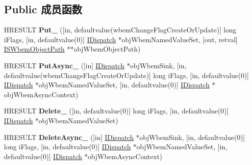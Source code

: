 \subsection*{Public 成员函数}
\begin{DoxyCompactItemize}
\item 
\mbox{\label{interface_wbem_scripting_1_1_i_s_wbem_object_a966384edba1a7bac57d55aaf29cff402}} 
H\+R\+E\+S\+U\+LT {\bfseries Put\+\_\+} (\mbox{[}in, defaultvalue(wbem\+Change\+Flag\+Create\+Or\+Update)\mbox{]} long i\+Flags, \mbox{[}in, defaultvalue(0)\mbox{]} \hyperlink{interface_i_dispatch}{I\+Dispatch} $\ast$obj\+Wbem\+Named\+Value\+Set, \mbox{[}out, retval\mbox{]} \hyperlink{interface_wbem_scripting_1_1_i_s_wbem_object_path}{I\+S\+Wbem\+Object\+Path} $\ast$$\ast$obj\+Wbem\+Object\+Path)
\item 
\mbox{\label{interface_wbem_scripting_1_1_i_s_wbem_object_a3aec8056ae762c6b562a015404db024c}} 
H\+R\+E\+S\+U\+LT {\bfseries Put\+Async\+\_\+} (\mbox{[}in\mbox{]} \hyperlink{interface_i_dispatch}{I\+Dispatch} $\ast$obj\+Wbem\+Sink, \mbox{[}in, defaultvalue(wbem\+Change\+Flag\+Create\+Or\+Update)\mbox{]} long i\+Flags, \mbox{[}in, defaultvalue(0)\mbox{]} \hyperlink{interface_i_dispatch}{I\+Dispatch} $\ast$obj\+Wbem\+Named\+Value\+Set, \mbox{[}in, defaultvalue(0)\mbox{]} \hyperlink{interface_i_dispatch}{I\+Dispatch} $\ast$obj\+Wbem\+Async\+Context)
\item 
\mbox{\label{interface_wbem_scripting_1_1_i_s_wbem_object_a67f3cbd99e3161546cac77cb2f9ddd71}} 
H\+R\+E\+S\+U\+LT {\bfseries Delete\+\_\+} (\mbox{[}in, defaultvalue(0)\mbox{]} long i\+Flags, \mbox{[}in, defaultvalue(0)\mbox{]} \hyperlink{interface_i_dispatch}{I\+Dispatch} $\ast$obj\+Wbem\+Named\+Value\+Set)
\item 
\mbox{\label{interface_wbem_scripting_1_1_i_s_wbem_object_a892d6fedbf4b81bd7bade08dddea1e68}} 
H\+R\+E\+S\+U\+LT {\bfseries Delete\+Async\+\_\+} (\mbox{[}in\mbox{]} \hyperlink{interface_i_dispatch}{I\+Dispatch} $\ast$obj\+Wbem\+Sink, \mbox{[}in, defaultvalue(0)\mbox{]} long i\+Flags, \mbox{[}in, defaultvalue(0)\mbox{]} \hyperlink{interface_i_dispatch}{I\+Dispatch} $\ast$obj\+Wbem\+Named\+Value\+Set, \mbox{[}in, defaultvalue(0)\mbox{]} \hyperlink{interface_i_dispatch}{I\+Dispatch} $\ast$obj\+Wbem\+Async\+Context)
$$
\end{DoxyCompactItemize}

